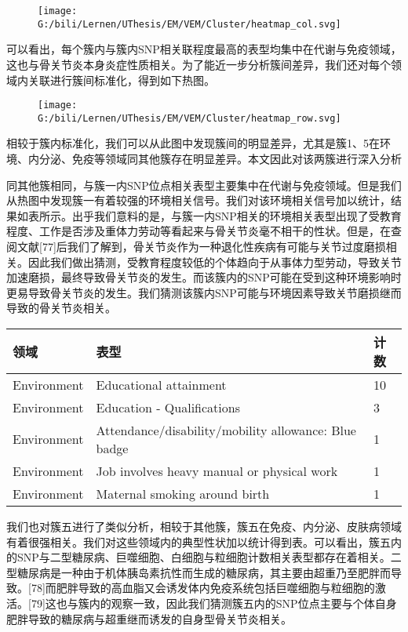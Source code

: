 \documentclass[
]{article}
\begin{document}
\begin{figure}
\centering
\texttt{[image: G:/bili/Lernen/UThesis/EM/VEM/Cluster/heatmap\_col.svg]}
\caption{}
\end{figure}

可以看出，每个簇内与簇内SNP相关联程度最高的表型均集中在代谢与免疫领域，这也与骨关节炎本身炎症性质相关。为了能近一步分析簇间差异，我们还对每个领域内关联进行簇间标准化，得到如下热图。

\begin{figure}
\centering
\texttt{[image: G:/bili/Lernen/UThesis/EM/VEM/Cluster/heatmap\_row.svg]}
\caption{}
\end{figure}

相较于簇内标准化，我们可以从此图中发现簇间的明显差异，尤其是簇1、5在环境、内分泌、免疫等领域同其他簇存在明显差异。本文因此对该两簇进行深入分析

同其他簇相同，与簇一内SNP位点相关表型主要集中在代谢与免疫领域。但是我们从热图中发现簇一有着较强的环境相关信号。我们对该环境相关信号加以统计，结果如表所示。出乎我们意料的是，与簇一内SNP相关的环境相关表型出现了受教育程度、工作是否涉及重体力劳动等看起来与骨关节炎毫不相干的性状。但是，在查阅文献{[}77{]}后我们了解到，骨关节炎作为一种退化性疾病有可能与关节过度磨损相关。因此我们做出猜测，受教育程度较低的个体趋向于从事体力型劳动，导致关节加速磨损，最终导致骨关节炎的发生。而该簇内的SNP可能在受到这种环境影响时更易导致骨关节炎的发生。我们猜测该簇内SNP可能与环境因素导致关节磨损继而导致的骨关节炎相关。

\begin{longtable}[]{@{}lll@{}}
\toprule()
领域 & 表型 & 计数 \\
\midrule()
\endhead
Environment & Educational attainment & 10 \\
Environment & Education - Qualifications & 3 \\
Environment & Attendance/disability/mobility allowance: Blue badge &
1 \\
Environment & Job involves heavy manual or physical work & 1 \\
Environment & Maternal smoking around birth & 1 \\
\bottomrule()
\end{longtable}

我们也对簇五进行了类似分析，相较于其他簇，簇五在免疫、内分泌、皮肤病领域有着很强相关。我们对这些领域内的典型性状加以统计得到表。可以看出，簇五内的SNP与二型糖尿病、巨噬细胞、白细胞与粒细胞计数相关表型都存在着相关。二型糖尿病是一种由于机体胰岛素抗性而生成的糖尿病，其主要由超重乃至肥胖而导致。{[}78{]}而肥胖导致的高血脂又会诱发体内免疫系统包括巨噬细胞与粒细胞的激活。{[}79{]}这也与簇内的观察一致，因此我们猜测簇五内的SNP位点主要与个体自身肥胖导致的糖尿病与超重继而诱发的自身型骨关节炎相关。
\end{document}
